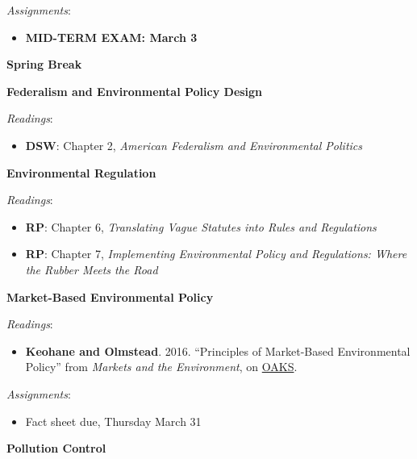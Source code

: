 \vspace{0.10in}

\emph{Assignments}:

\begin{itemize}

\item
  \textbf{MID-TERM EXAM: March 3}
\end{itemize}

\week \textbf{Spring Break}

\week \textbf{Federalism and Environmental Policy Design}

\emph{Readings}:

\begin{itemize}

\item
  \textbf{DSW}: Chapter 2, \emph{American Federalism and Environmental
  Politics}
\end{itemize}

\week \textbf{Environmental Regulation}

\emph{Readings}:

\begin{itemize}
\item
  \textbf{RP}: Chapter 6, \emph{Translating Vague Statutes into Rules
  and Regulations}
\item
  \textbf{RP}: Chapter 7, \emph{Implementing Environmental Policy and
  Regulations: Where the Rubber Meets the Road}
\end{itemize}

\week \textbf{Market-Based Environmental Policy}

\emph{Readings}:

\begin{itemize}

\item
  \textbf{Keohane and Olmstead}. 2016. ``Principles of Market-Based
  Environmental Policy'' from \emph{Markets and the Environment}, on
  \href{https://lms.cofc.edu}{OAKS}.
\end{itemize}

\vspace{0.10in}

\emph{Assignments}:

\begin{itemize}

\item
  Fact sheet due, Thursday March 31
\end{itemize}

\week \textbf{Pollution Control}

